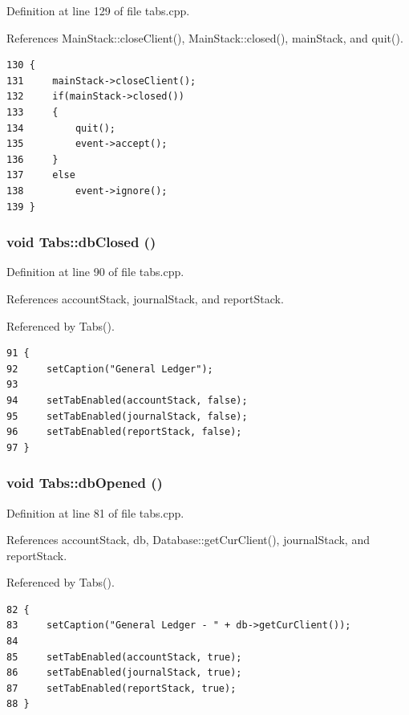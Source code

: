 Definition at line 129 of file tabs.cpp.

References Main\-Stack::close\-Client(), Main\-Stack::closed(), main\-Stack, and quit().

\footnotesize\begin{verbatim}130 {
131     mainStack->closeClient();
132     if(mainStack->closed())
133     {
134         quit();
135         event->accept();
136     }
137     else
138         event->ignore();
139 }
\end{verbatim}\normalsize 


\hypertarget{classTabs_k1}{
\subsubsection[dbClosed]{\setlength{\rightskip}{0pt plus 5cm}void Tabs::db\-Closed ()}}
\label{classTabs_k1}


Definition at line 90 of file tabs.cpp.

References account\-Stack, journal\-Stack, and report\-Stack.

Referenced by Tabs().

\footnotesize\begin{verbatim}91 {
92     setCaption("General Ledger");
93     
94     setTabEnabled(accountStack, false);
95     setTabEnabled(journalStack, false);
96     setTabEnabled(reportStack, false);
97 }
\end{verbatim}\normalsize 


\hypertarget{classTabs_k0}{
\subsubsection[dbOpened]{\setlength{\rightskip}{0pt plus 5cm}void Tabs::db\-Opened ()}}
\label{classTabs_k0}


Definition at line 81 of file tabs.cpp.

References account\-Stack, db, Database::get\-Cur\-Client(), journal\-Stack, and report\-Stack.

Referenced by Tabs().

\footnotesize\begin{verbatim}82 {
83     setCaption("General Ledger - " + db->getCurClient());
84     
85     setTabEnabled(accountStack, true);
86     setTabEnabled(journalStack, true);
87     setTabEnabled(reportStack, true);
88 }
\end{verbatim}\normalsize 


